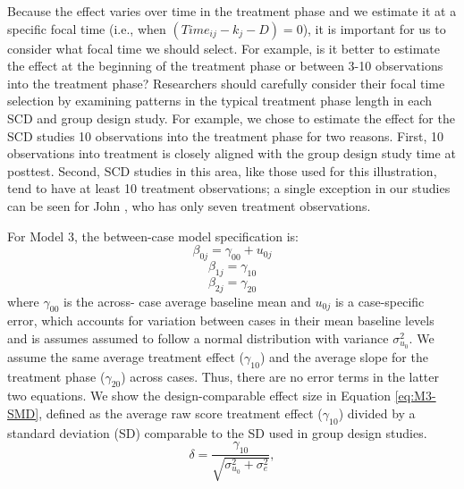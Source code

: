\documentclass[
]{book}
\begin{document}
Because the effect varies over time in the treatment phase and we estimate it at a specific focal time (i.e., when \((Time_{ij}-k_j-D)=0\)), it is important for us to consider what focal time we should select. For example, is it better to estimate the effect at the beginning of the treatment phase or between 3-10 observations into the treatment phase? Researchers should carefully consider their focal time selection by examining patterns in the typical treatment phase length in each SCD and group design study. For example, we chose to estimate the effect for the SCD studies 10 observations into the treatment phase for two reasons. First, 10 observations into treatment is closely aligned with the group design study time at posttest. Second, SCD studies in this area, like those used for this illustration, tend to have at least 10 treatment observations; a single exception in our studies can be seen for John \citep{delemere2018ParentImplemented}, who has only seven treatment observations.

For Model 3, the between-case model specification is:
\begin{equation}
\label{eq:M3-L2-intercept}
\beta_{0j} = \gamma_{00} + u_{0j}
\end{equation}
\begin{equation}
\label{eq:M3-L2-slope-trt}
\beta_{1j} = \gamma_{10}
\end{equation}
\begin{equation}
\label{eq:M3-L2-slope-interaction}
\beta_{2j} = \gamma_{20}
\end{equation}
where \(\gamma_{00}\) is the across- case average baseline mean and \(u_{0j}\) is a case-specific error, which accounts for variation between cases in their mean baseline levels and is assumes assumed to follow a normal distribution with variance \(\sigma_{u_0}^2\). We assume the same average treatment effect (\(\gamma_{10}\)) and the average slope for the treatment phase (\(\gamma_{20}\)) across cases. Thus, there are no error terms in the latter two equations. We show the design-comparable effect size in Equation \eqref{eq:M3-SMD}, defined as the average raw score treatment effect (\(\gamma_{10}\)) divided by a standard deviation (SD) comparable to the SD used in group design studies.
\begin{equation}
\label{eq:M3-SMD}
\delta = \frac{\gamma_{10}}{\sqrt{\sigma_{u_0}^2 + \sigma_e^2}},
\end{equation}
\end{document}
